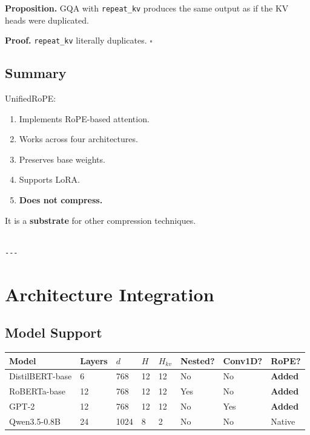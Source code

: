 \textbf{Proposition.} GQA with \texttt{repeat\_kv} produces the same output as if the 
KV heads were duplicated.

\textbf{Proof.} \texttt{repeat\_kv} literally duplicates. $\square$

\subsection{Summary}

UnifiedRoPE:
\begin{enumerate}
\item Implements RoPE-based attention.
\item Works across four architectures.
\item Preserves base weights.
\item Supports LoRA.
\item \textbf{Does not compress.}

\end{enumerate}
It is a \textbf{substrate} for other compression techniques.
\begin{lstlisting}

---
\end{lstlisting}


\section{Architecture Integration}

\subsection{Model Support}

\begin{table}[H]
\centering
\small
\begin{tabular}{llllllll}
\toprule
\textbf{Model} & \textbf{Layers} & \textbf{$d$} & \textbf{$H$} & \textbf{$H_{kv}$} & \textbf{Nested?} & \textbf{Conv1D?} & \textbf{RoPE?} \\
\midrule
DistilBERT-base & 6 & 768 & 12 & 12 & No & No & \textbf{Added} \\
RoBERTa-base & 12 & 768 & 12 & 12 & Yes & No & \textbf{Added} \\
GPT-2 & 12 & 768 & 12 & 12 & No & Yes & \textbf{Added} \\
Qwen3.5-0.8B & 24 & 1024 & 8 & 2 & No & No & Native \\
\bottomrule
\end{tabular}
\end{table}

